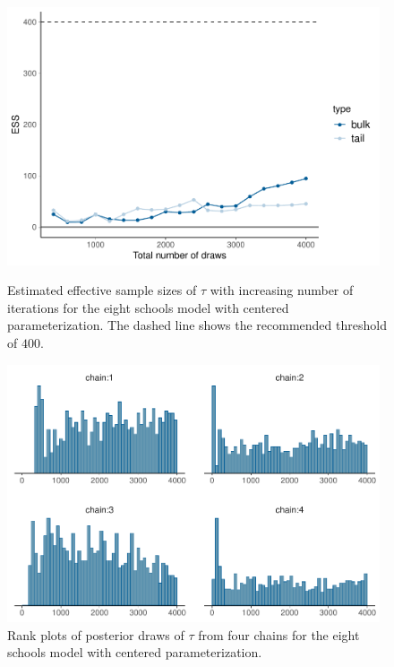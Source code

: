 \documentclass[american,]{article}
\theoremstyle{definition}
\begin{document}
\begin{figure}[tp]
  \centering
  \begin{minipage}{0.48\textwidth}
  \includegraphics[width=0.98\textwidth]{graphics/change-ess-fit-cp-1.pdf}
  \caption{Estimated effective sample sizes of $\tau$ with increasing number of iterations
  for the eight schools model with centered parameterization. The dashed line shows the
    recommended threshold of $400$.}
  \label{fig:change-ess-fit-cp-1}
\end{minipage}
\hfill
  \begin{minipage}{0.48\textwidth}
  \includegraphics[width=0.98\textwidth]{graphics/hist-fit-cp-1.pdf}
  \caption{Rank plots of posterior draws of $\tau$ from four chains for 
  the eight schools model with centered parameterization.}
  \label{fig:hist-fit-cp-1}
\end{minipage}
\end{figure}
\end{document}

